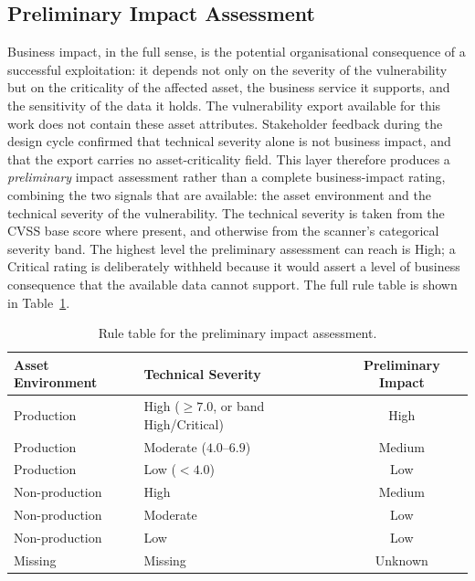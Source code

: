 \subsection{Preliminary Impact Assessment}
\label{subsec:preliminary-impact}

Business impact, in the full sense, is the potential organisational consequence of a successful exploitation: it depends not only on the severity of the vulnerability but on the criticality of the affected asset, the business service it supports, and the sensitivity of the data it holds. The vulnerability export available for this work does not contain these asset attributes. Stakeholder feedback during the design cycle confirmed that technical severity alone is not business impact, and that the export carries no asset-criticality field. This layer therefore produces a \emph{preliminary} impact assessment rather than a complete business-impact rating, combining the two signals that are available: the asset environment and the technical severity of the vulnerability. The technical severity is taken from the \ac{CVSS} base score where present, and otherwise from the scanner's categorical severity band. The highest level the preliminary assessment can reach is High; a Critical rating is deliberately withheld because it would assert a level of business consequence that the available data cannot support. The full rule table is shown in Table~\ref{tab:preliminary-impact}.

\begin{table}[h]
\centering
\begin{tabular}{@{}llc@{}}
\toprule
\textbf{Asset Environment} & \textbf{Technical Severity} & \textbf{Preliminary Impact} \\
\midrule
Production     & High ($\geq 7.0$, or band High/Critical) & High \\
Production     & Moderate ($4.0$--$6.9$)                  & Medium \\
Production     & Low ($< 4.0$)                            & Low \\
Non-production & High                                     & Medium \\
Non-production & Moderate                                 & Low \\
Non-production & Low                                      & Low \\
Missing        & Missing                                  & Unknown \\
\bottomrule
\end{tabular}
\caption{Rule table for the preliminary impact assessment.}
\label{tab:preliminary-impact}
\end{table}

